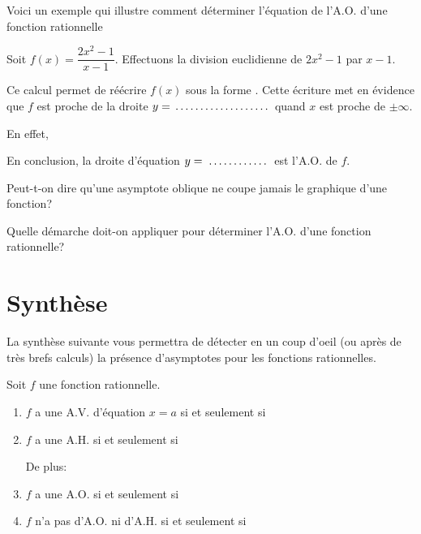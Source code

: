 \documentclass[a4paper,12pt]{report}
\newcommand{\jdot}[1]{ \makebox[#1]{\dotfill}}
\newcommand{\pminf}{\pm\infty}
\begin{document}
Voici un exemple qui illustre comment déterminer l'équation de
l'A.O. d'une fonction rationnelle
\begin{exemple}
Soit \(f(x)=\dfrac{2x^2-1}{x-1}\). Effectuons la division euclidienne de
\(2x^2-1\) par \(x-1\).

\vspace{6cm}

Ce calcul permet de réécrire \(f(x)\) sous la forme \jdot{4cm}. Cette écriture met en
évidence que \(f\) est proche de la droite \(y=\jdot{3cm}\) quand \(x\) est proche de \(\pminf\).

En effet,

\vspace{4cm}


En conclusion, la droite d'équation \(y=\jdot{2cm}\) est l'A.O. de \(f\).
\end{exemple}



\begin{exercice}
Peut-t-on dire qu'une asymptote oblique ne coupe jamais le graphique d'une fonction?
\end{exercice}

\begin{exercice}
Quelle démarche doit-on appliquer pour déterminer l'A.O. d'une fonction rationnelle?
\end{exercice}
\section{Synthèse}
\label{sec:org110a3e9}
La synthèse suivante vous permettra de détecter en un coup d'oeil (ou après de
très brefs calculs) la présence d'asymptotes pour les fonctions rationnelles.
\begin{tcolorbox}
Soit \(f\) une fonction rationnelle.
\begin{enumerate}
\item \(f\) a une A.V. d'équation \(x=a\) si et seulement si\dotfill

\dotfill

\item \(f\) a une A.H. si et seulement si \dotfill

\dotfill

De plus: \dotfill

\dotfill

\item \(f\) a une A.O. si et seulement si \dotfill

\dotfill

\item \(f\) n'a pas d'A.O. ni d'A.H. si et seulement si\dotfill

\dotfill
\end{enumerate}
\end{tcolorbox}
\end{document}
